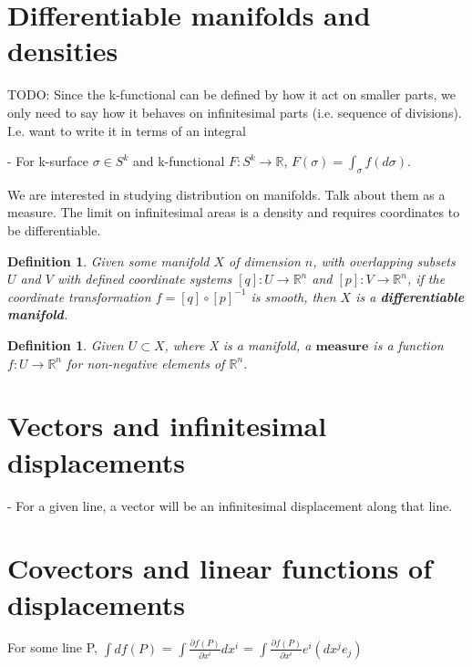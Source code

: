 \documentclass{book}
\newtheorem{defn}[equation]{Definition}
\begin{document}
\section{Differentiable manifolds and densities}

TODO: Since the k-functional can be defined by how it act on smaller parts, we only need to say how it behaves on infinitesimal parts (i.e. sequence of divisions). I.e. want to write it in terms of an integral

- For k-surface $\sigma \in S^k$ and k-functional $F: S^k \to \mathbb{R}$, $F(\sigma) = \int_{\sigma}f(d\sigma)$. 

We are interested in studying distribution on manifolds. Talk about them as a measure. The limit on infinitesimal areas is a density and requires coordinates to be differentiable.


\begin{defn}
	Given some manifold $X$ of dimension $n$, with overlapping subsets $U$ and $V$ with defined coordinate systems $[q]: U \to \mathbb{R}^n$ and $[p]: V \to \mathbb{R}^n$, if the coordinate transformation $f = [q] \circ [p]^{-1}$ is smooth, then $X$ is a \textbf{differentiable manifold}. 
\end{defn}

\begin{defn}
	Given $U \subset X$, where X is a manifold, a $\textbf{measure}$ is a function $f : U \to \mathbb{R}^n$ for non-negative elements of $\mathbb{R}^n$. 
\end{defn}




\section{Vectors and infinitesimal displacements}

- For a given line, a vector will be an infinitesimal displacement along that line. 




\section{Covectors and linear functions of displacements}

For some line P, $\int df(P)$ = $\int \frac{\partial f(P)}{{\partial x^i}} dx^i$ = $\int \frac{{\partial f(P)}}{{\partial x^i}} e^i (dx^j e_j)$
\end{document}
